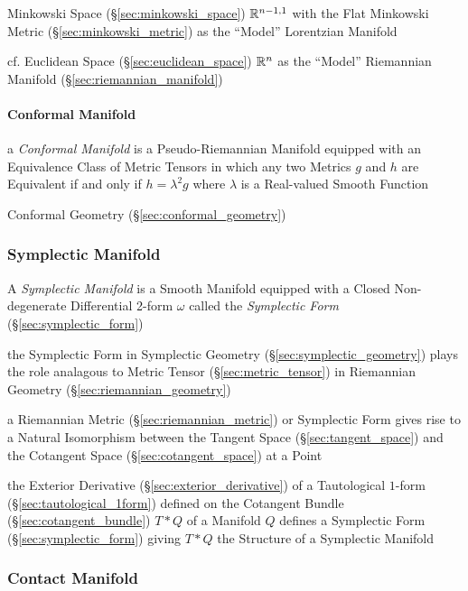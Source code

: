 Minkowski Space (\S\ref{sec:minkowski_space}) $\mathbb{R}^{n-1,1}$
with the Flat Minkowski Metric (\S\ref{sec:minkowski_metric}) as the
``Model'' Lorentzian Manifold

cf. Euclidean Space (\S\ref{sec:euclidean_space}) $\mathbb{R}^n$ as the
``Model'' Riemannian Manifold (\S\ref{sec:riemannian_manifold})



\paragraph{Conformal Manifold}\label{sec:conformal_manifold}\hfill

a \emph{Conformal Manifold} is a Pseudo-Riemannian Manifold equipped with an
Equivalence Class of Metric Tensors in which any two Metrics $g$ and $h$ are
Equivalent if and only if $h = \lambda^2 g$ where $\lambda$ is a Real-valued
Smooth Function

\fist Conformal Geometry (\S\ref{sec:conformal_geometry})



\subsubsection{Symplectic Manifold}\label{sec:symplectic_manifold}

A \emph{Symplectic Manifold} is a Smooth Manifold equipped with a Closed
Non-degenerate Differential 2-form $\omega$ called the \emph{Symplectic Form}
(\S\ref{sec:symplectic_form})

the Symplectic Form in Symplectic Geometry (\S\ref{sec:symplectic_geometry})
plays the role analagous to Metric Tensor (\S\ref{sec:metric_tensor}) in
Riemannian Geometry (\S\ref{sec:riemannian_geometry})

a Riemannian Metric (\S\ref{sec:riemannian_metric}) or Symplectic Form gives
rise to a Natural Isomorphism between the Tangent Space
(\S\ref{sec:tangent_space}) and the Cotangent Space
(\S\ref{sec:cotangent_space}) at a Point

the Exterior Derivative (\S\ref{sec:exterior_derivative}) of a Tautological
$1$-form (\S\ref{sec:tautological_1form}) defined on the Cotangent Bundle
(\S\ref{sec:cotangent_bundle}) $T *
Q$ of a Manifold $Q$ defines a Symplectic Form (\S\ref{sec:symplectic_form})
giving $T * Q$ the Structure of a Symplectic Manifold



\subsubsection{Contact Manifold}\label{sec:contact_manifold}

